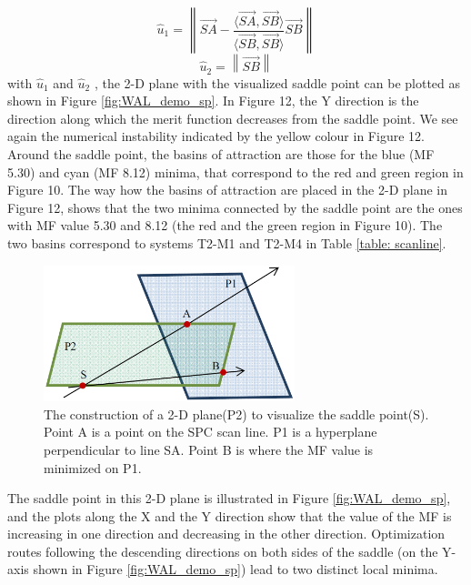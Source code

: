 \setlength{\belowdisplayshortskip}{5pt}
\setlength{\abovedisplayshortskip}{5pt}
\begin{equation} \label{eq:u1}
\hat{u}_{1} =  \left\| \overrightarrow{SA}-{\frac{\langle \overrightarrow{SA},\overrightarrow{SB}\rangle}{\langle \overrightarrow{SB},\overrightarrow{SB}\rangle}}\overrightarrow{SB} \right\| 
\end{equation}
\setlength{\belowdisplayshortskip}{10pt}
\begin{equation} \label{eq:u2}
\hat{u}_{2} = \left\| \overrightarrow{SB} \right\|
\end{equation}
with $\hat{u}_{1}$ and $\hat{u}_{2}$ , the 2-D plane with the visualized saddle point can be plotted as shown in Figure \ref{fig:WAL_demo_sp}.
In Figure 12, the Y direction is the direction along which the merit function decreases from the saddle point. We see again the numerical instability indicated by the yellow colour in Figure 12. Around the saddle point, the basins of attraction are those for the blue (MF 5.30) and cyan (MF 8.12) minima, that correspond to the red and green region in Figure 10. The way how the basins of attraction are placed in the 2-D plane in Figure 12, shows that the two minima connected by the saddle point are the ones with MF value 5.30 and 8.12 (the red and the green region in Figure 10). The two basins correspond to systems T2-M1 and T2-M4 in Table \ref{table: scanline}.

\begin{figure}[h!]
    \centering
    \includegraphics[width=0.65\textwidth]{chapter-4/figures/hyperplane.png}
    \caption{The construction of a 2-D plane(P2) to visualize the saddle point(S). Point A is a point on the SPC scan line. P1 is a hyperplane perpendicular to line SA. Point B is where the MF value is minimized on P1.}
    \label{fig:hyperplane}
\end{figure}
The saddle point in this 2-D plane is illustrated in Figure \ref{fig:WAL_demo_sp}, and the plots along the X and the Y direction show that the value of the MF is increasing in one direction and decreasing in the other direction. Optimization routes following the descending directions on both sides of the saddle (on the Y-axis shown in Figure \ref{fig:WAL_demo_sp}) lead to two distinct local minima.

